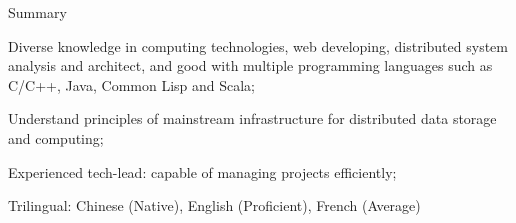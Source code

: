 \documentclass{resume} %
\begin{document}
\begin{rSection}{Summary}

\item Diverse knowledge in computing technologies, web developing, distributed system analysis and architect,
 and good with multiple programming languages such as C/C++, Java, Common Lisp and Scala;
\item Understand principles of mainstream infrastructure for distributed data storage and computing;
\item Experienced tech-lead: capable of managing projects efficiently;
\item Trilingual: Chinese (Native), English (Proficient), French (Average)
\end{rSection}





\end{document}
